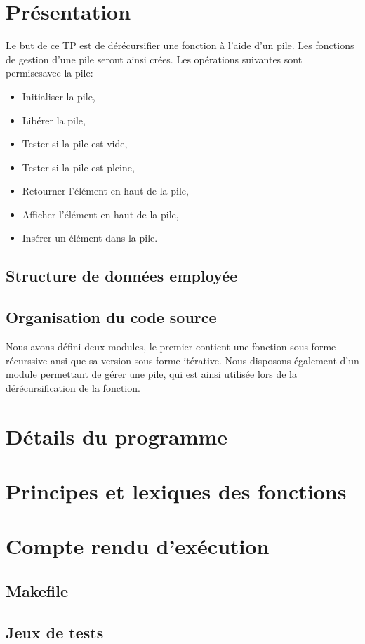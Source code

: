 \documentclass{report}
\begin{document}
  
  \setlength{\parskip}{10pt}
  \setlength{\parindent}{0pt}
  \chapter{Présentation}
    Le but de ce TP est de dérécursifier une fonction à l'aide d'un pile. Les fonctions de gestion d'une pile seront ainsi crées.
    Les opérations suivantes sont permisesavec la pile:
    \begin{itemize}
      \item Initialiser la pile,
      \item Libérer la pile,
      \item Tester si la pile est vide,
      \item Tester si la pile est pleine,
      \item Retourner l'élément en haut de la pile,
      \item Afficher l'élément en haut de la pile,
      \item Insérer un élément dans la pile.
    \end{itemize}

    \section{Structure de données employée}
      
    \section{Organisation du code source}
      Nous avons défini deux modules, le premier contient une fonction sous forme récurssive ansi que sa version sous forme itérative. Nous disposons également d'un module permettant de gérer une pile, qui est ainsi utilisée lors de la dérécursification de la fonction.
      
  \chapter{Détails du programme}
    

 \chapter{Principes et lexiques des fonctions}
    

  \chapter{Compte rendu d'exécution}
    \section{Makefile}

    \section{Jeux de tests}
      
\end{document}
